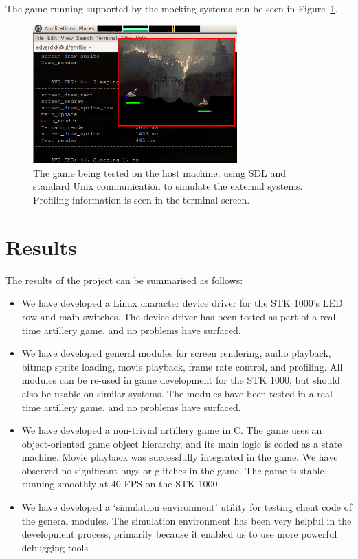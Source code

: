 \documentclass[a4paper,10pt]{article}
\begin{document}
The game running supported by the mocking systems can be seen in
Figure~\ref{fig:hosttest}. 

\begin{figure}[!h]
    \centering

    \includegraphics[width=0.7\textwidth]{host_test.png}

    \caption{The game being tested on the host machine, using SDL and standard
    Unix communication to simulate the external systems. Profiling information
    is seen in the terminal screen.} 

    \label{fig:hosttest}
\end{figure}

\section{Results}
\label{sec:results}
The results of the project can be summarised as follows:
\begin{itemize}
    \item We have developed a Linux character device driver for the STK 1000's
        LED row and main switches. The device driver has been tested as part
        of a real-time artillery game, and no problems have surfaced.

    \item We have developed general modules for screen rendering, audio
        playback, bitmap sprite loading, movie playback, frame rate control,
        and profiling.  All modules can be re-used in game development for the
        STK 1000, but should also be usable on similar systems. The modules
        have been tested in a real-time artillery game, and no problems have
        surfaced.

    \item We have developed a non-trivial artillery game in C. 
        The game uses an object-oriented game object hierarchy, and its main
        logic is coded as a state machine. Movie playback was successfully
        integrated in the game. We have observed no significant bugs or
        glitches in the game. The game is stable, running smoothly at 40 FPS
        on the STK 1000.

    \item We have developed a `simulation environment' utility for testing
        client code of the general modules. The simulation environment
        has been very helpful in the development process, primarily because it
        enabled us to use more powerful debugging tools.
\end{itemize}
\end{document}
